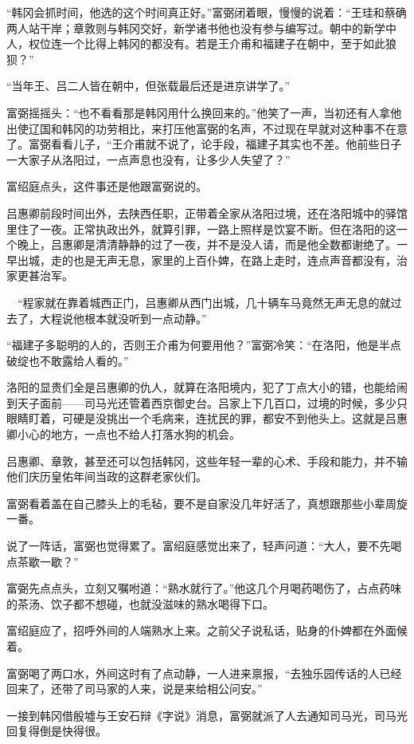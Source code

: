 “韩冈会抓时间，他选的这个时间真正好。”富弼闭着眼，慢慢的说着：“王珪和蔡确两人站干岸；章敦则与韩冈交好，新学诸书他也没有参与编写过。朝中的新学中人，权位连一个比得上韩冈的都没有。若是王介甫和福建子在朝中，至于如此狼狈？”

“当年王、吕二人皆在朝中，但张载最后还是进京讲学了。”

富弼摇摇头：“也不看看那是韩冈用什么换回来的。”他笑了一声，当初还有人拿他出使辽国和韩冈的功劳相比，来打压他富弼的名声，不过现在早就对这种事不在意了。富弼看看儿子，“王介甫就不说了，论手段，福建子其实也不差。他前些日子一大家子从洛阳过，一点声息也没有，让多少人失望了？”

富绍庭点头，这件事还是他跟富弼说的。

吕惠卿前段时间出外，去陕西任职，正带着全家从洛阳过境，还在洛阳城中的驿馆里住了一夜。正常执政出外，就算引罪，一路上照样是饮宴不断。但在洛阳的这一个晚上，吕惠卿是清清静静的过了一夜，并不是没人请，而是他全数都谢绝了。一早出城，走的也是无声无息，家里的上百仆婢，在路上走时，连点声音都没有，治家更甚治军。

　“程家就在靠着城西正门，吕惠卿从西门出城，几十辆车马竟然无声无息的就过去了，大程说他根本就没听到一点动静。”

“福建子多聪明的人的，否则王介甫为何要用他？”富弼冷笑：“在洛阳，他是半点破绽也不敢露给人看的。”

洛阳的显贵们全是吕惠卿的仇人，就算在洛阳境内，犯了丁点大小的错，也能给闹到天子面前——司马光还管着西京御史台。吕家上下几百口，过境的时候，多少只眼睛盯着，可硬是没挑出一个毛病来，连扰民的罪，都安不到他头上。这就是吕惠卿小心的地方，一点也不给人打落水狗的机会。

吕惠卿、章敦，甚至还可以包括韩冈，这些年轻一辈的心术、手段和能力，并不输他们庆历皇佑年间当政的这群老家伙们。

富弼看着盖在自己膝头上的毛毡，要不是自家没几年好活了，真想跟那些小辈周旋一番。

说了一阵话，富弼也觉得累了。富绍庭感觉出来了，轻声问道：“大人，要不先喝点茶歇一歇？”

富弼先点点头，立刻又嘱咐道：“熟水就行了。”他这几个月喝药喝伤了，占点药味的茶汤、饮子都不想碰，也就没滋味的熟水喝得下口。

富绍庭应了，招呼外间的人端熟水上来。之前父子说私话，贴身的仆婢都在外面候着。

富弼喝了两口水，外间这时有了点动静，一人进来禀报，“去独乐园传话的人已经回来了，还带了司马家的人来，说是来给相公问安。”

一接到韩冈借殷墟与王安石辩《字说》消息，富弼就派了人去通知司马光，司马光回复得倒是快得很。

